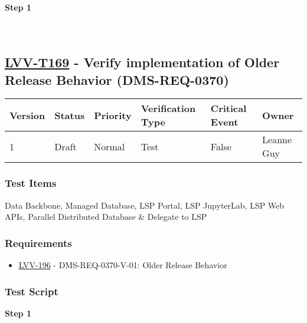 \textbf{Step 1}\\
~\\
~\\

\hypertarget{lvv-t169---verify-implementation-of-older-release-behavior-dms-req-0370}{%
\subsection{\texorpdfstring{\href{https://jira.lsstcorp.org/secure/Tests.jspa\#/testCase/LVV-T169}{LVV-T169}
- Verify implementation of Older Release Behavior
(DMS-REQ-0370)}{LVV-T169 - Verify implementation of Older Release Behavior (DMS-REQ-0370)}}\label{lvv-t169---verify-implementation-of-older-release-behavior-dms-req-0370}}

\begin{longtable}[]{@{}llllll@{}}
\toprule
Version & Status & Priority & Verification Type & Critical Event &
Owner\tabularnewline
\midrule
\endhead
1 & Draft & Normal & Test & False & Leanne Guy\tabularnewline
\bottomrule
\end{longtable}

\hypertarget{test-items-145}{%
\subsubsection{Test Items}\label{test-items-145}}

Data Backbone, Managed Database, LSP Portal, LSP JupyterLab, LSP Web
APIs, Parallel Distributed Database \& Delegate to LSP

\hypertarget{requirements-146}{%
\subsubsection{Requirements}\label{requirements-146}}

\begin{itemize}
\tightlist
\item
  \href{https://jira.lsstcorp.org/browse/LVV-196}{LVV-196} -
  DMS-REQ-0370-V-01: Older Release Behavior
\end{itemize}

\hypertarget{test-script-146}{%
\subsubsection{Test Script}\label{test-script-146}}

\textbf{Step 1}\\
~\\
~\\

